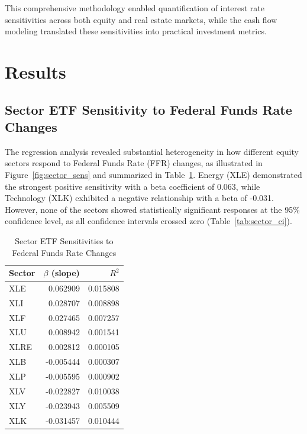 \documentclass[12pt, stu, abstract]{apa7}
\begin{document}
This comprehensive methodology enabled quantification of interest rate sensitivities across both equity and real estate markets, while the cash flow modeling translated these sensitivities into practical investment metrics.

\section{Results}
\subsection{Sector ETF Sensitivity to Federal Funds Rate Changes}

The regression analysis revealed substantial heterogeneity in how different equity sectors respond to Federal Funds Rate (FFR) changes, as illustrated in Figure~\ref{fig:sector_sens} and summarized in Table~\ref{tab:sector_betas}. Energy (XLE) demonstrated the strongest positive sensitivity with a beta coefficient of 0.063, while Technology (XLK) exhibited a negative relationship with a beta of -0.031. However, none of the sectors showed statistically significant responses at the 95\% confidence level, as all confidence intervals crossed zero (Table~\ref{tab:sector_ci}).

\begin{table}[htbp]
\centering
\caption{Sector ETF Sensitivities to Federal Funds Rate Changes}
\label{tab:sector_betas}
\begin{tabular}{lrr}
\toprule
Sector & $\beta$ (slope) & $R^2$ \\
\midrule
XLE & 0.062909 & 0.015808 \\
XLI & 0.028707 & 0.008898 \\
XLF & 0.027465 & 0.007257 \\
XLU & 0.008942 & 0.001541 \\
XLRE & 0.002812 & 0.000105 \\
XLB & -0.005444 & 0.000307 \\
XLP & -0.005595 & 0.000902 \\
XLV & -0.022827 & 0.010038 \\
XLY & -0.023943 & 0.005509 \\
XLK & -0.031457 & 0.010444 \\
\bottomrule
\end{tabular}
\end{table}
\end{document}
